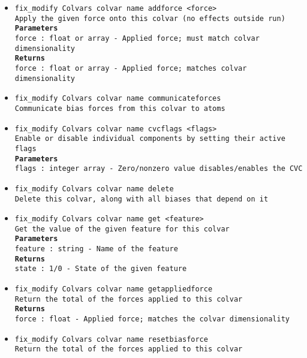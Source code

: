 \begin{itemize}
\item \texttt{fix\_modify Colvars colvar name addforce <force>}
\\
\texttt{Apply the given force onto this colvar (no effects outside run)}
\\
\texttt{\textbf{Parameters}}
\\
\texttt{force : float or array - Applied force; must match colvar dimensionality}
\\
\texttt{\textbf{Returns}}
\\
\texttt{force : float or array - Applied force; matches colvar dimensionality}
\item \texttt{fix\_modify Colvars colvar name communicateforces}
\\
\texttt{Communicate bias forces from this colvar to atoms}
\item \texttt{fix\_modify Colvars colvar name cvcflags <flags>}
\\
\texttt{Enable or disable individual components by setting their active flags}
\\
\texttt{\textbf{Parameters}}
\\
\texttt{flags : integer array - Zero/nonzero value disables/enables the CVC}
\item \texttt{fix\_modify Colvars colvar name delete}
\\
\texttt{Delete this colvar, along with all biases that depend on it}
\item \texttt{fix\_modify Colvars colvar name get <feature>}
\\
\texttt{Get the value of the given feature for this colvar}
\\
\texttt{\textbf{Parameters}}
\\
\texttt{feature : string - Name of the feature}
\\
\texttt{\textbf{Returns}}
\\
\texttt{state : 1/0 - State of the given feature}
\item \texttt{fix\_modify Colvars colvar name getappliedforce}
\\
\texttt{Return the total of the forces applied to this colvar}
\\
\texttt{\textbf{Returns}}
\\
\texttt{force : float - Applied force; matches the colvar dimensionality}
\item \texttt{fix\_modify Colvars colvar name resetbiasforce}
\\
\texttt{Return the total of the forces applied to this colvar}

\end{itemize}
